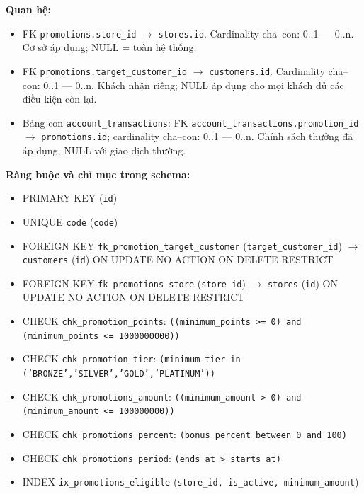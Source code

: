 \textbf{Quan hệ:}

\begin{itemize}

\item FK \texttt{promotions.store\_id} $\rightarrow$ \texttt{stores.id}. Cardinality cha--con: 0..1 — 0..n. Cơ sở áp dụng; NULL = toàn hệ thống.

\item FK \texttt{promotions.target\_customer\_id} $\rightarrow$ \texttt{customers.id}. Cardinality cha--con: 0..1 — 0..n. Khách nhận riêng; NULL áp dụng cho mọi khách đủ các điều kiện còn lại.

\item Bảng con \texttt{account\_transactions}: FK \texttt{account\_transactions.promotion\_id} $\rightarrow$ \texttt{promotions.id}; cardinality cha--con: 0..1 — 0..n. Chính sách thưởng đã áp dụng, NULL với giao dịch thường.

\end{itemize}

\textbf{Ràng buộc và chỉ mục trong schema:}

\begin{itemize}

\item PRIMARY KEY (\texttt{id})

\item UNIQUE \texttt{code} (\texttt{code})

\item FOREIGN KEY \texttt{fk\_promotion\_target\_customer} (\texttt{target\_customer\_id}) $\rightarrow$ \texttt{customers} (\texttt{id}) ON UPDATE NO ACTION ON DELETE RESTRICT

\item FOREIGN KEY \texttt{fk\_promotions\_store} (\texttt{store\_id}) $\rightarrow$ \texttt{stores} (\texttt{id}) ON UPDATE NO ACTION ON DELETE RESTRICT

\item CHECK \texttt{chk\_promotion\_points}: \texttt{((minimum\_points >= 0) and (minimum\_points <= 1000000000))}

\item CHECK \texttt{chk\_promotion\_tier}: \texttt{(minimum\_tier in ('BRONZE','SILVER','GOLD','PLATINUM'))}

\item CHECK \texttt{chk\_promotions\_amount}: \texttt{((minimum\_amount > 0) and (minimum\_amount <= 100000000))}

\item CHECK \texttt{chk\_promotions\_percent}: \texttt{(bonus\_percent between 0 and 100)}

\item CHECK \texttt{chk\_promotions\_period}: \texttt{(ends\_at > starts\_at)}

\item INDEX \texttt{ix\_promotions\_eligible} (\texttt{store\_id, is\_active, minimum\_amount})

\end{itemize}

